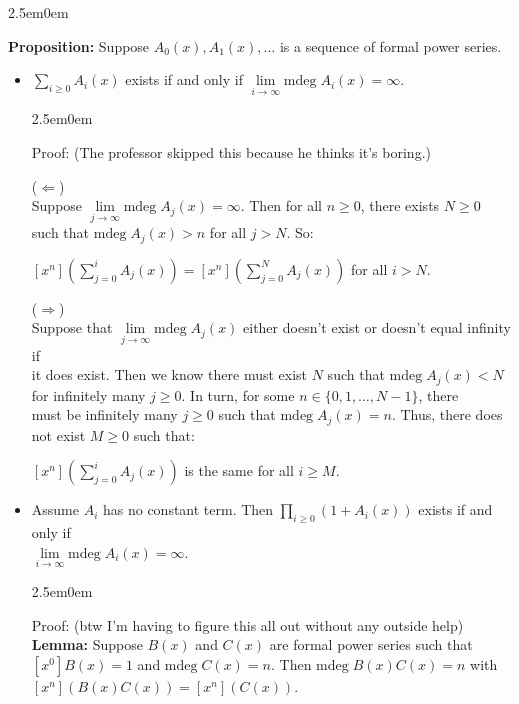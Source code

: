 \documentclass{book}
\newcommand{\hTwo}{%
\color{MidnightBlue}%
   \fontsize{13}{15}\selectfont%
}
\newcommand{\hThree}{%
   \color{PineGreen!85!Orange}
   \fontsize{12}{14}\selectfont%
}
\newcommand{\myComment}{%
   \color{RawerSienna}%
   \fontsize{12}{14}\selectfont%
}
\newenvironment{myIndent}{%
   \begin{adjustwidth}{2.5em}{0em}%
}{%
   \end{adjustwidth}%
}
\newcommand{\blab}[1]{\textbf{#1}}
\newcommand{\mdeg}{\mathrm{mdeg}\phantom{.}}
\newcommand{\retTwo}{\hfill\bigbreak}
\begin{document}
\begin{myIndent}\hTwo
   \blab{Proposition:} Suppose $A_0(x), A_1(x), \ldots$ is a sequence of formal power series.
   \begin{itemize}
      \item $\sum\limits_{i \geq 0} A_i(x)$ exists if and only if $\lim\limits_{i \rightarrow \infty} \mdeg A_i(x) = \infty$.
      
      \begin{myIndent}\hThree
         Proof: {\myComment(The professor skipped this because he thinks it's boring.)}

         ($\Longleftarrow$)\\ [2pt]
         Suppose $\lim\limits_{j \rightarrow \infty} \mdeg A_j(x) = \infty$. Then for all $n \geq 0$, there exists $N \geq 0$ such that $\mdeg A_j(x) > n$ for all $j > N$. So:
         
         {\centering $[x^n]\left(\sum\limits_{j = 0}^i A_j(x)\right) = [x^n]\left(\sum\limits_{j = 0}^N A_j(x)\right)$ for all $i > N$.\retTwo\par}

         ($\Longrightarrow$)\\ [2pt]
         Suppose that $\lim\limits_{j \rightarrow \infty} \mdeg A_j(x)$ either doesn't exist or doesn't equal infinity if\\ [-1pt] it does exist. Then we know there must exist $N$ such that $\mdeg A_j(x) < N$\\ [3pt] for infinitely many $j \geq 0$. In turn, for some $n \in \{0, 1, \ldots, N - 1\}$, there\\ [3pt] must be infinitely many $j \geq 0$ such that $\mdeg A_j(x) = n$. Thus, there does\\ [3pt] not exist $M \geq 0$ such that:

         {\centering $[x^n]\left(\sum\limits_{j = 0}^i A_j(x)\right)$ is the same for all $i \geq M$.  \retTwo\par}
      \end{myIndent}
      
      \item Assume $A_i$ has no constant term. Then $\prod\limits_{i \geq 0}(1 + A_i(x))$ exists if and only if\\ [-8pt] $\lim\limits_{i \rightarrow \infty} \mdeg A_i(x) = \infty$.
      
      \begin{myIndent}\hThree
         Proof: {\myComment (btw I'm having to figure this all out without any outside help)}\\
         \blab{Lemma:} Suppose $B(x)$ and $C(x)$ are formal power series such that\\ $[x^0]B(x) = 1$ and $\mdeg C(x) = n$. Then $\mdeg B(x)C(x) = n$ with\\ $[x^n](B(x)C(x)) = [x^n](C(x))$.\retTwo


\end{myIndent}
\end{itemize}
\end{myIndent}
\end{document}
